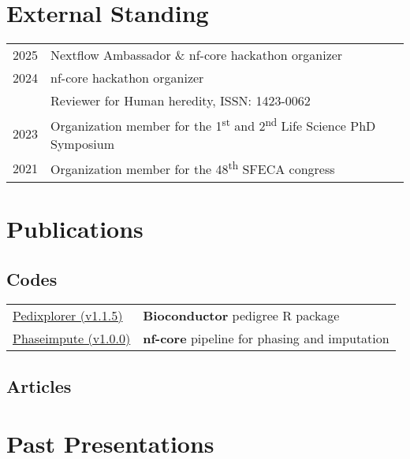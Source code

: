 \documentclass[11pt,a4paper]{moderncv}
\begin{document}
\section{External Standing}
\begin{tabularx}{\textwidth}{p{} X}
    2025 & Nextflow Ambassador \& nf-core hackathon organizer \\
    2024 & nf-core hackathon organizer \\
    & Reviewer for Human heredity, ISSN: 1423-0062 \\
    2023 & Organization member for the 1\textsuperscript{st} and 2\textsuperscript{nd} Life Science PhD Symposium \\
    2021 & Organization member for the 48\textsuperscript{th} SFECA congress \\
\end{tabularx}

\section{Publications}
    \subsection{Codes}
    \begin{tabularx}{\textwidth}{p{} X}
        \href{https://www.bioconductor.org/packages/release/bioc/html/Pedixplorer.html}{Pedixplorer (v1.1.5)} & \textbf{Bioconductor} pedigree R package \\
        \href{https://nf-co.re/phaseimpute}{Phaseimpute (v1.0.0)} & \textbf{nf-core} pipeline for phasing and imputation \\
    \end{tabularx}

    \subsection{Articles}
    


\section{Past Presentations}
\end{document}
